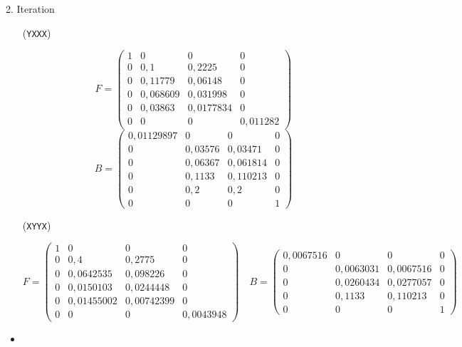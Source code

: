 \documentclass{homework}
\begin{document}
\begin{enumerate}
\begin{itemize}
\end{itemize}

2. Iteration

\begin{itemize}
\item[(\texttt{YXXX})]

$$F = \begin{pmatrix}
1 & 0 & 0 & 0\\
0 & 0,1 & 0,2225 & 0\\
0 & 0,11779 & 0,06148 & 0\\
0 & 0,068609 & 0,031998 & 0\\
0 & 0,03863 & 0,0177834 & 0\\
0 & 0 & 0 & 0,011282
\end{pmatrix}
$$
$$
B = \begin{pmatrix}
0,01129897 & 0 & 0 & 0\\
0 & 0,03576 & 0,03471 & 0\\
0 & 0,06367 & 0,061814 & 0\\
0 & 0,1133 & 0,110213 & 0\\
0 & 0,2 & 0,2 & 0\\
0 & 0 & 0 & 1
\end{pmatrix}$$

\item[(\texttt{XYYX})]

$$F = \begin{pmatrix}
1 & 0 & 0 & 0\\
0 & 0,4 & 0,2775 & 0\\
0 & 0,0642535 & 0,098226 & 0\\
0 & 0,0150103 & 0,0244448 & 0\\
0 & 0,01455002 & 0,00742399 & 0\\
0 & 0 & 0 & 0,0043948
\end{pmatrix}
\quad
B = \begin{pmatrix}
0,0067516 & 0 & 0 & 0\\
0 & 0,0063031 & 0,0067516 & 0\\
0 & 0,0260434 & 0,0277057 & 0\\
0 & 0,1133 & 0,110213 & 0\\
0 & 0 & 0 & 1
\end{pmatrix}$$

\item


\end{itemize}
\end{enumerate}
\end{document}
